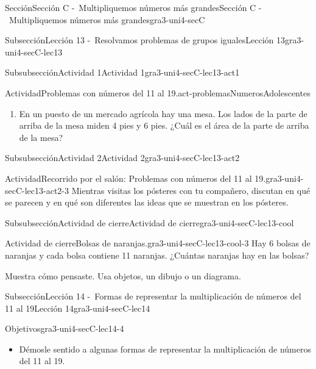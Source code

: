 \documentclass[twoside,10pt,]{article}
\begin{document}
\begin{sectionptx}{Sección}{Sección C -~Multipliquemos números más grandes}{}{Sección C -~Multipliquemos números más grandes}{}{}{gra3-uni4-secC}
\begin{subsectionptx}{Subsección}{Lección 13 -~Resolvamos problemas de grupos iguales}{}{Lección 13}{}{}{gra3-uni4-secC-lec13}
\begin{subsubsectionptx}{Subsubsección}{Actividad 1}{}{Actividad 1}{}{}{gra3-uni4-secC-lec13-act1}
\begin{activity}{Actividad}{Problemas con números del 11 al 19.}{act-problemasNumerosAdolescentes}
\begin{enumerate}
\item{}En un puesto de un mercado agrícola hay una mesa. Los lados de la parte de arriba de la mesa miden 4 pies y 6 pies. ¿Cuál es el área de la parte de arriba de la mesa?%
\end{enumerate}
\end{activity}%
\end{subsubsectionptx}
%
%
\typeout{************************************************}
\typeout{************************************************}
%
\begin{subsubsectionptx}{Subsubsección}{Actividad 2}{}{Actividad 2}{}{}{gra3-uni4-secC-lec13-act2}
\begin{activity}{Actividad}{Recorrido por el salón: Problemas con números del 11 al 19.}{gra3-uni4-secC-lec13-act2-3}%
Mientras visitas los pósteres con tu compañero, discutan en qué se parecen y en qué son diferentes las ideas que se muestran en los pósteres.%
\end{activity}%
\end{subsubsectionptx}
%
%
\typeout{************************************************}
\typeout{************************************************}
%
\begin{subsubsectionptx}{Subsubsección}{Actividad de cierre}{}{Actividad de cierre}{}{}{gra3-uni4-secC-lec13-cool}
\begin{project}{Actividad de cierre}{Bolsas de naranjas.}{gra3-uni4-secC-lec13-cool-3}%
Hay 6 bolsas de naranjas y cada bolsa contiene 11 naranjas. ¿Cuántas naranjas hay en las bolsas?%
\par
Muestra cómo pensaste. Usa objetos, un dibujo o un diagrama.%
\end{project}%
\end{subsubsectionptx}
\end{subsectionptx}
%
%
\typeout{************************************************}
\typeout{************************************************}
%
\begin{subsectionptx}{Subsección}{Lección 14 -~Formas de representar la multiplicación de números del 11 al 19}{}{Lección 14}{}{}{gra3-uni4-secC-lec14}
\begin{objectives}{Objetivos}{gra3-uni4-secC-lec14-4}
%
\begin{itemize}[label=\textbullet]
\item{}Démosle sentido a algunas formas de representar la multiplicación de números del 11 al 19.%

\end{itemize}
\end{objectives}
\end{subsectionptx}
\end{sectionptx}
\end{document}
